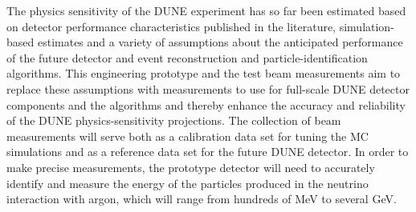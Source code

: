 
The physics sensitivity of the DUNE experiment has so far been
estimated based on detector performance characteristics published in
the literature, simulation-based estimates and a variety of
assumptions about the anticipated performance of the future detector
and event reconstruction and particle-identification algorithms.  This
engineering prototype and the test beam measurements aim to replace
these assumptions with measurements to use for full-scale DUNE
detector components and the algorithms and thereby enhance the
accuracy and reliability of the DUNE physics-sensitivity projections.
The collection of beam measurements will serve both as a calibration
data set for tuning the MC simulations and as a reference data set for
the future DUNE detector.
%
In order to make precise measurements, the prototype detector will
need to accurately identify and measure the energy of the particles
produced in the neutrino interaction with argon, which will range from
hundreds of MeV to several GeV.

